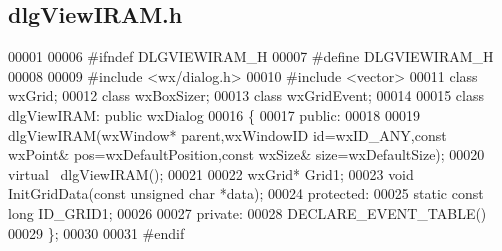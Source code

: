 \subsection{dlg\+View\+I\+R\+A\+M.\+h}
\label{dlgViewIRAM_8h_source}

\begin{DoxyCode}
00001 
00006 \textcolor{preprocessor}{#ifndef DLGVIEWIRAM\_H}
00007 \textcolor{preprocessor}{#define DLGVIEWIRAM\_H}
00008 
00009 \textcolor{preprocessor}{#include <wx/dialog.h>}
00010 \textcolor{preprocessor}{#include <vector>}
00011 \textcolor{keyword}{class }wxGrid;
00012 \textcolor{keyword}{class }wxBoxSizer;
00013 \textcolor{keyword}{class }wxGridEvent;
00014 
00015 \textcolor{keyword}{class }dlgViewIRAM: \textcolor{keyword}{public} wxDialog
00016 \{
00017     \textcolor{keyword}{public}:
00018 
00019         dlgViewIRAM(wxWindow* parent,wxWindowID \textcolor{keywordtype}{id}=wxID\_ANY,\textcolor{keyword}{const} wxPoint& pos=wxDefaultPosition,\textcolor{keyword}{const} 
      wxSize& size=wxDefaultSize);
00020         \textcolor{keyword}{virtual} ~dlgViewIRAM();
00021 
00022         wxGrid* Grid1;
00023         \textcolor{keywordtype}{void} InitGridData(\textcolor{keyword}{const} \textcolor{keywordtype}{unsigned} \textcolor{keywordtype}{char} *data);
00024     \textcolor{keyword}{protected}:
00025         \textcolor{keyword}{static} \textcolor{keyword}{const} \textcolor{keywordtype}{long} ID_GRID1;
00026 
00027     \textcolor{keyword}{private}:
00028         DECLARE\_EVENT\_TABLE()
00029 \};
00030 
00031 \textcolor{preprocessor}{#endif}
\end{DoxyCode}
